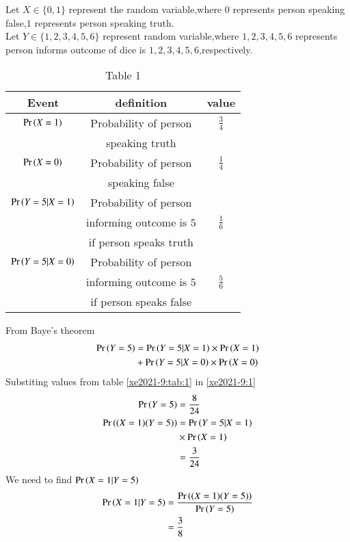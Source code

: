 Let $X \in \{0,1\}$ represent the random variable,where $0$ represents person speaking false,$1$ represents person speaking truth.\\
Let $Y \in \{1,2,3,4,5,6\}$  represent random variable,where $1,2,3,4,5,6$ represents person informs outcome of dice is $1,2,3,4,5,6$,respectively.\\
\begin{table}[h!]
\resizebox{\columnwidth}{!}
{ 
\begin{tabular}{|c|c|c|}
\hline
Event & definition & value\\
\hline
$ \Pr\left(X=1\right) $ & Probability of person  & $\frac{3}{4}$\\
&speaking truth & \\
\hline
$ \Pr\left(X=0\right) $ & Probability of person & $\frac{1}{4}$ \\
& speaking false & \\
\hline
$\Pr\left(Y=5|X=1\right)$ & Probability of person  & \\
&  informing outcome is $5$ & $\frac{1}{6}$  \\
& if person speaks truth & \\
\hline
$\Pr\left(Y=5|X=0\right)$ & Probability of person & \\
& informing outcome is $5$ &  $\frac{5}{6}$ \\
& if person speaks false & \\ 
\hline
\end{tabular}
}
\caption{Table 1} 
\label{xe2021-9:tab:1}
\end{table}
From Baye's theorem
\begin{align}
\pr{Y=5}&=\pr{Y=5|X=1} \times \pr{X=1} \notag \\
 & +\pr{Y=5|X=0} \times \pr{X=0}  \label{xe2021-9:1}
 \end{align}
Substiting values from table \eqref{xe2021-9:tab:1} in \eqref{xe2021-9:1}
\begin{align}
\pr{Y=5} &=\frac{8}{24} \label{xe2021-9:2} \\
\pr{(X=1)(Y=5)}&= \pr{Y=5|X=1} \notag \\
& \times \pr{X=1} \\ 
&= \frac{3}{24}  \label{xe2021-9:3}
\end{align}
We need to find $\Pr\left(X=1|Y=5\right)$ \\
\begin{align}
\Pr\left(X=1|Y=5\right) &= \frac{\Pr\left((X=1 ) (Y=5)\right)}{\Pr\left(Y=5\right)} \\
&=\frac{3}{8}
\end{align}
